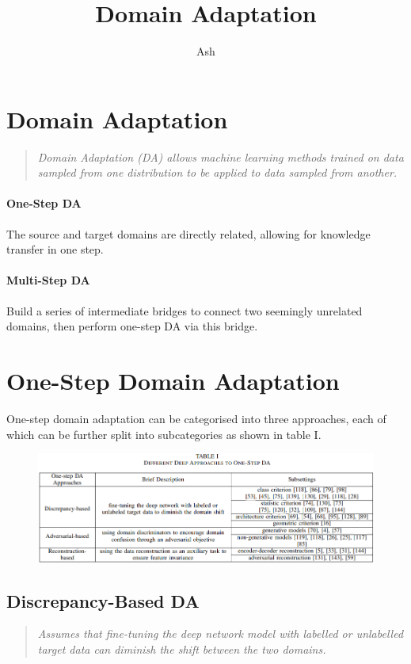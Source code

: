 \documentclass{report}
\title{Domain Adaptation}
\author{Ash}
\newcommand{\quoteit}[1]{\begin{quote}\textit{#1}\end{quote}}
\begin{document}
	
\chapter*{Domain Adaptation}

\quoteit{Domain Adaptation (DA) allows machine learning methods trained on data sampled from one distribution to be applied to data sampled from another.}
\vspace{3cm}


\subsubsection*{One-Step DA}
The source and target domains are directly related, allowing for knowledge transfer in one step.

\subsubsection*{Multi-Step DA}
Build a series of intermediate bridges to connect two seemingly unrelated domains, then perform one-step DA via this bridge.



\setcounter{chapter}{1}
\chapter*{One-Step Domain Adaptation}
One-step domain adaptation can be categorised into three approaches, each of which can be further split into subcategories as shown in table I.
\begin{figure}[!h]
	\centering
	\includegraphics[width=17cm]{one-step-approaches}
	\label{fig:one-step-approaches:1}
\end{figure}


\section{Discrepancy-Based DA}
\quoteit{Assumes that fine-tuning the deep network model with labelled or unlabelled target data can diminish the shift between the two domains.}
\end{document}
